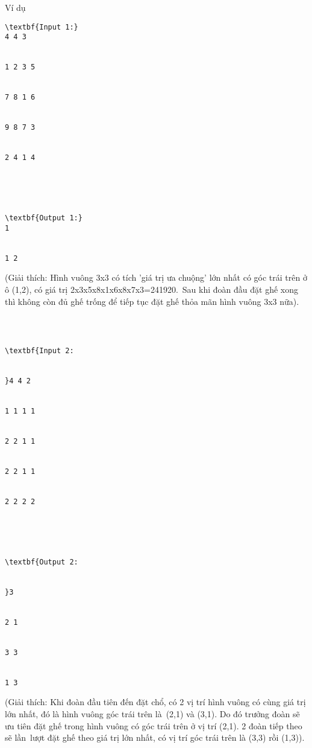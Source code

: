 Ví dụ
\begin{verbatim}
\textbf{Input 1:}
4 4 3


1 2 3 5


7 8 1 6


9 8 7 3


2 4 1 4





\textbf{Output 1:}
1


1 2\end{verbatim}

   (Giải thích: Hình vuông 3x3 có tích 'giá trị ưa chuộng' lớn nhất có góc trái trên ở ô (1,2), có giá trị 2x3x5x8x1x6x8x7x3=241920. Sau khi đoàn đầu đặt ghế xong thì không còn đủ ghế trống để tiếp tục đặt ghế thỏa mãn hình vuông 3x3 nữa).  
\begin{verbatim}



\textbf{Input 2:


}4 4 2


1 1 1 1


2 2 1 1


2 2 1 1


2 2 2 2





\textbf{Output 2:


}3


2 1


3 3


1 3\end{verbatim}




   (Giải thích: Khi đoàn đầu tiên đến đặt chổ, có 2 vị trí hình vuông có cùng giá trị lớn nhất, đó là hình vuông góc trái trên là (2,1) và (3,1). Do đó trưởng đoàn sẽ ưu tiên đặt ghế trong hình vuông có góc trái trên ở vị trí (2,1). 2 đoàn tiếp theo sẽ lần lượt đặt ghế theo giá trị lớn nhất, có vị trí góc trái trên là (3,3) rồi (1,3)).